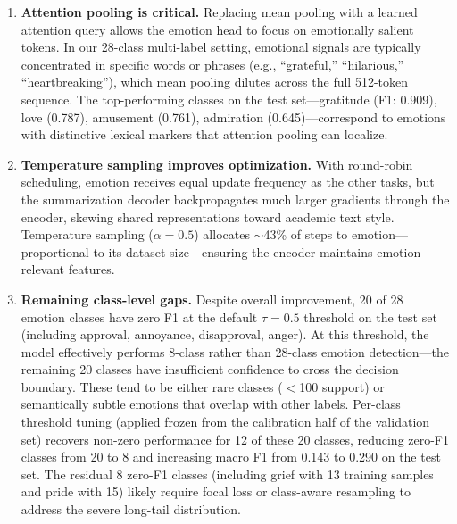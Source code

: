 \documentclass[11pt]{article}
\begin{document}
\begin{enumerate}
    \item \textbf{Attention pooling is critical.} Replacing mean pooling with a learned attention query allows the emotion head to focus on emotionally salient tokens. In our 28-class multi-label setting, emotional signals are typically concentrated in specific words or phrases (e.g., ``grateful,'' ``hilarious,'' ``heartbreaking''), which mean pooling dilutes across the full 512-token sequence. The top-performing classes on the test set---gratitude (F1: 0.909), love (0.787), amusement (0.761), admiration (0.645)---correspond to emotions with distinctive lexical markers that attention pooling can localize.

    \item \textbf{Temperature sampling improves optimization.} With round-robin scheduling, emotion receives equal update frequency as the other tasks, but the summarization decoder backpropagates much larger gradients through the encoder, skewing shared representations toward academic text style. Temperature sampling ($\alpha=0.5$) allocates $\sim$43\% of steps to emotion---proportional to its dataset size---ensuring the encoder maintains emotion-relevant features.

    \item \textbf{Remaining class-level gaps.} Despite overall improvement, 20 of 28 emotion classes have zero F1 at the default $\tau=0.5$ threshold on the test set (including approval, annoyance, disapproval, anger). At this threshold, the model effectively performs 8-class rather than 28-class emotion detection---the remaining 20 classes have insufficient confidence to cross the decision boundary. These tend to be either rare classes ($<$100 support) or semantically subtle emotions that overlap with other labels. Per-class threshold tuning (applied frozen from the calibration half of the validation set) recovers non-zero performance for 12 of these 20 classes, reducing zero-F1 classes from 20 to 8 and increasing macro F1 from 0.143 to 0.290 on the test set. The residual 8 zero-F1 classes (including grief with 13 training samples and pride with 15) likely require focal loss \citep{lin2017focal} or class-aware resampling to address the severe long-tail distribution.


\end{enumerate}
\end{document}
